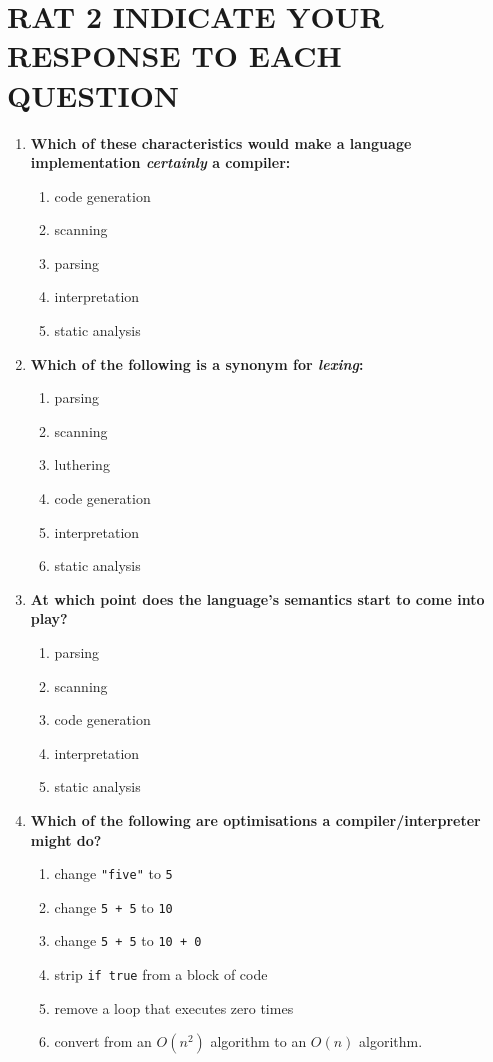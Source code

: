 \documentclass[twoside=false, DIV=14]{scrartcl}
\begin{document}
\newpage
\part*{RAT 2 \hspace{6em} {\small INDICATE YOUR RESPONSE TO EACH QUESTION}}
\RAT
\begin{enumerate}
\item \textbf{Which of these characteristics would make a language implementation \emph{certainly} a compiler:}
\begin{enumerate}
  \item code generation \tick
  \item scanning
  \item parsing
  \item interpretation
  \item static analysis
\end{enumerate}

\item \textbf{Which of the following is a synonym for \emph{lexing}:}
\begin{enumerate}
  \item parsing
  \item scanning \tick
  \item luthering
  \item code generation
  \item interpretation
  \item static analysis
\end{enumerate}

\item \textbf{At which point does the language's semantics start to come into play?}
\begin{enumerate}
  \item parsing
  \item scanning
  \item code generation
  \item interpretation
  \item static analysis \tick
\end{enumerate}

\item \textbf{Which of the following are optimisations a compiler/interpreter might do?}
\begin{enumerate}
  \item change \lstinline|"five"| to \lstinline|5|
  \item change \lstinline|5 + 5| to \lstinline|10| \tick
  \item change \lstinline|5 + 5| to \lstinline|10 + 0|
  \item strip \lstinline|if true| from a block of code \tick
  \item remove a loop that executes zero times \tick
  \item convert from an $O(n^2)$ algorithm to an $O(n)$ algorithm.
\end{enumerate}


\end{enumerate}
\end{document}
